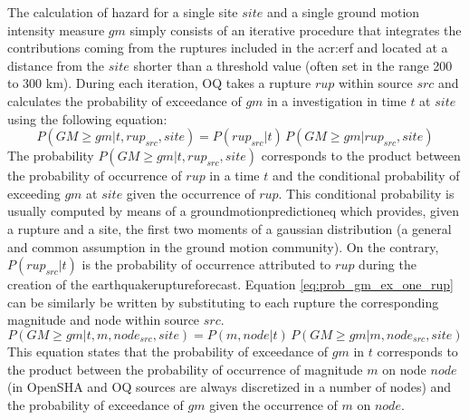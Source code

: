 The calculation of hazard for a single site $site$ and a single ground 
motion intensity measure $gm$ simply consists of an iterative procedure 
that integrates the contributions coming from the ruptures included in 
the \gls{acr:erf} and located at a distance from the $site$ shorter 
than a threshold value (often set in the range 200 to 300 km). 
%
During each iteration, OQ takes a rupture $rup$ within source $src$ and
calculates the probability of exceedance of $gm$ in a investigation in 
time $t$ at $site$ using the following equation:
\begin{equation}
P(GM \geq gm|t,rup_{src},site) = 
	P(rup_{src}|t)\,
	P(GM\geq gm|rup_{src},site)
\label{eq:prob_gm_ex_one_rup}
\end{equation}
The probability $P(GM \geq gm|t,rup_{src},site)$ corresponds to 
the product between the probability of occurrence of $rup$ in a time 
$t$ and the conditional probability of exceeding $gm$ at $site$ 
given the occurrence of $rup$. 
%
This conditional probability is usually computed by means of a 
\gls{groundmotionpredictioneq} which provides, given a rupture 
and a site, the first two moments of a gaussian distribution 
(a general and common assumption in the ground motion community). 
%
On the contrary, $P(rup_{src}|t)$ is the probability of occurrence 
attributed to $rup$ during the creation of the 
\gls{earthquakeruptureforecast}.
Equation \ref{eq:prob_gm_ex_one_rup} can be similarly be written 
by substituting to each rupture the corresponding magnitude and 
node within source $src$.
\begin{equation}
P(GM \geq gm|t,m,node_{src},site) = 
	P(m,node|t)\,
	P(GM\geq gm|m,node_{src},site)
\end{equation}
This equation states that the probability of exceedance of $gm$ in $t$
corresponds to the product between the probability of occurrence
of magnitude $m$ on node $node$ (in OpenSHA and OQ sources are always 
discretized in a number of nodes) and the probability of exceedance of
$gm$ given the occurrence of $m$ on $node$. 

